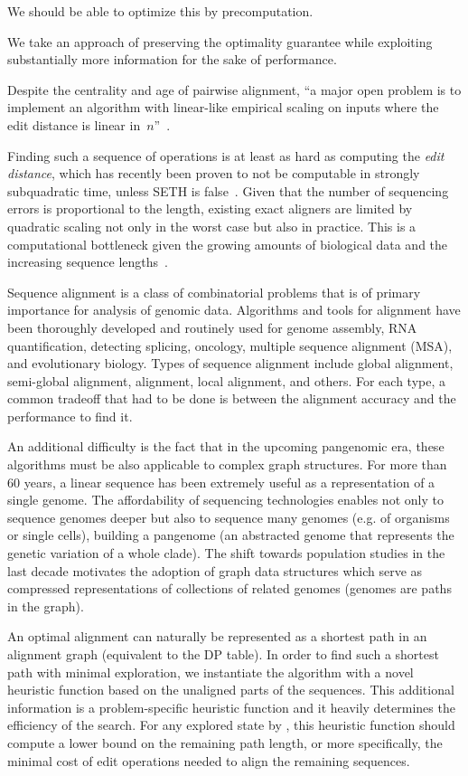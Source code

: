 We should be able to optimize this by precomputation.

We take an approach of preserving the optimality guarantee while exploiting
substantially more information for the sake of performance.

Despite the centrality and age of pairwise alignment, ``a major open problem is
to implement an algorithm with linear-like empirical scaling on inputs where the
edit distance is linear in~$n$''~\citep{medvedev2022theoretical}.

Finding such a sequence of operations is at least as hard as computing the
\emph{edit distance}, which has recently been proven to not be computable in
strongly subquadratic time, unless SETH is false~\citep{backurs2015edit}. Given
that the number of sequencing errors is proportional to the length, existing
exact aligners are limited by quadratic scaling not only in the worst case but
also in practice. This is a computational bottleneck given the growing amounts
of biological data and the increasing sequence
lengths~\citep{kucherov2019evolution}.

Sequence alignment is a class of combinatorial problems that is of primary
importance for analysis of genomic data. Algorithms and tools for alignment have
been thoroughly developed and routinely used for genome assembly, RNA
quantification, detecting splicing, oncology, multiple sequence alignment (MSA),
and evolutionary biology. Types of sequence alignment include global alignment,
semi-global alignment, alignment, local alignment, and others. For each type, a
common tradeoff that had to be done is between the alignment accuracy and the
performance to find it.

An additional difficulty is the fact that in the
upcoming pangenomic era, these algorithms must be also applicable to complex
graph structures. For more than 60 years, a linear sequence has been extremely
useful as a representation of a single genome. The affordability of sequencing
technologies enables not only to sequence genomes deeper but also to sequence
many genomes (e.g. of organisms or single cells), building a pangenome (an
abstracted genome that represents the genetic variation of a whole clade). The
shift towards population studies in the last decade motivates the adoption of
graph data structures which serve as compressed representations of collections
of related genomes (genomes are paths in the graph).

An optimal alignment can naturally be represented as a shortest path in an
alignment graph (equivalent to the DP table). In order to find such a shortest
path with minimal exploration, we instantiate the \A algorithm with a novel
heuristic function based on the unaligned parts of the sequences. This
additional information is a problem-specific heuristic function and it heavily
determines the efficiency of the search. For any explored state by \A, this
heuristic function should compute a lower bound on the remaining path length, or
more specifically, the minimal cost of edit operations needed to align the
remaining sequences.

